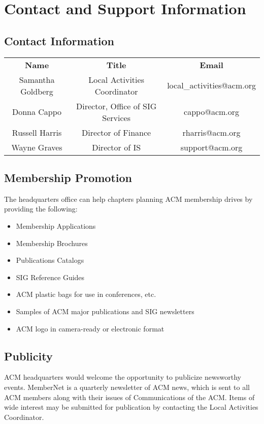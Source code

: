 %
%

\chapter{Contact and Support Information}
\label{app:app01}

\section*{Contact Information}
\begin{center}
\begin{tabular}{ c c c }	
\textbf{Name} & \textbf{Title} & \textbf{E\-mail} \\
Samantha Goldberg & Local Activities Coordinator & local\_activities@acm.org \\
Donna Cappo & Director, Office of SIG Services & cappo@acm.org \\
Russell Harris & Director of Finance & rharris@acm.org \\
Wayne Graves & Director of IS & support@acm.org   
\end{tabular}
\end{center}

\section*{Membership Promotion}
The headquarters office can help chapters planning ACM membership drives by providing the following:
\begin{itemize}
	\item Membership Applications
    \item Membership Brochures
	\item Publications Catalogs
	\item SIG Reference Guides
	\item ACM plastic bags for use in conferences, etc.
	\item Samples of ACM major publications and SIG newsletters
	\item ACM logo in camera-ready or electronic format
\end{itemize}

\section*{Publicity}
ACM headquarters would welcome the opportunity to publicize newsworthy events. MemberNet is a quarterly newsletter of ACM news, which is sent to all ACM members along with their issues of Communications of the ACM. Items of wide interest may be submitted for publication by contacting the Local Activities Coordinator.


